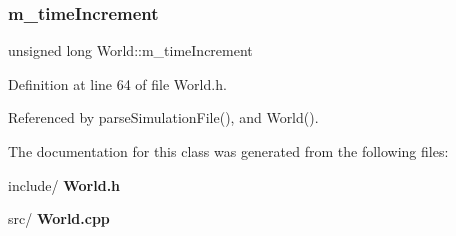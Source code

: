 \mbox{\label{class_world_a97f773548fef49eb408115c097aa995d}} 
\subsubsection{m\+\_\+time\+Increment}
{\footnotesize\ttfamily unsigned long World\+::m\+\_\+time\+Increment\hspace{0.3cm}{\ttfamily [private]}}



Definition at line 64 of file World.\+h.



Referenced by parse\+Simulation\+File(), and World().



The documentation for this class was generated from the following files\+:\begin{DoxyCompactItemize}
\item 
include/\textbf{ World.\+h}\item 
src/\textbf{ World.\+cpp}\end{DoxyCompactItemize}
